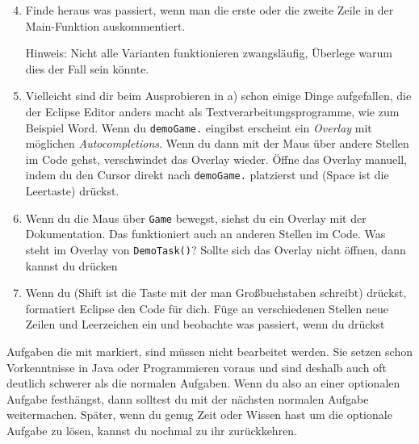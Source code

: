 \begin{enumerate} \setcounter{enumi}{3}
\item Finde heraus was passiert, wenn man die erste oder die zweite Zeile in der Main-Funktion auskommentiert.

Hinweis: Nicht alle Varianten funktionieren zwangsläufig, Überlege warum dies der Fall sein könnte.
\item Vielleicht sind dir beim Ausprobieren in a) schon einige Dinge aufgefallen, die der Eclipse Editor anders macht als Textverarbeitungsprogramme, wie zum Beispiel Word.
Wenn du \lstinline{demoGame.} eingibst erscheint ein \textit{Overlay} mit möglichen \textit{Autocompletions}.
Wenn du dann mit der Maus über andere Stellen im Code gehst, verschwindet das Overlay wieder.
Öffne das Overlay manuell, indem du den Cursor direkt nach \lstinline{demoGame.} platzierst und  (Space ist die Leertaste) drückst.
\item
Wenn du die Maus über \lstinline{Game} bewegst, siehst du ein Overlay mit der Dokumentation.
Das funktioniert auch an anderen Stellen im Code.
Was steht im Overlay von \lstinline{DemoTask()}? Sollte sich das Overlay nicht öffnen, dann kannst du  drücken
\item
Wenn du  (Shift ist die Taste mit der man Großbuchstaben schreibt) drückst, formatiert Eclipse den Code für dich.
Füge an verschiedenen Stellen neue Zeilen und Leerzeichen ein und beobachte was passiert, wenn du  drückst
\end{enumerate}


\begin{Infobox}
    Aufgaben die mit \optional markiert, sind müssen nicht bearbeitet werden.
    Sie setzen schon Vorkenntnisse in Java oder Programmieren voraus und sind deshalb auch oft deutlich schwerer als die normalen Aufgaben.
    Wenn du also an einer optionalen Aufgabe festhängst, dann solltest du mit der nächsten normalen Aufgabe weitermachen.
    Später, wenn du genug Zeit oder Wissen hast um die optionale Aufgabe zu lösen, kannst du nochmal zu ihr zurückkehren.
\end{Infobox}


